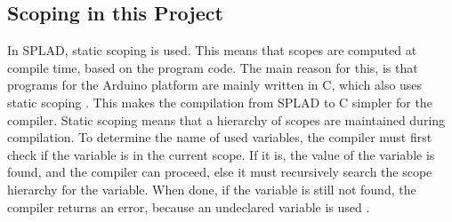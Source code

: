\subsection{Scoping in this Project}
In SPLAD, static scoping is used. This means that scopes are computed at compile time, based on the program code. The main reason for this, is that programs for the Arduino platform are mainly written in C, which also uses static scoping \citep{sebesta}. This makes the compilation from SPLAD to C simpler for the compiler. Static scoping means that a hierarchy of scopes are maintained during compilation. To determine the name of used variables, the compiler must first check if the variable is in the current scope. If it is, the value of the variable is found, and the compiler can proceed, else it must recursively search the scope hierarchy for the variable. When done, if the variable is still not found, the compiler returns an error, because an undeclared variable is used \citep{sebesta}.